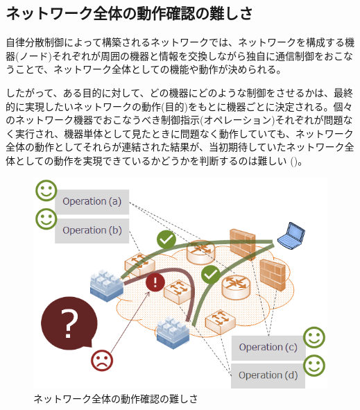   \subsection{ネットワーク全体の動作確認の難しさ}

自律分散制御によって構築されるネットワークでは、ネットワークを構成する機
器(ノード)それぞれが周囲の機器と情報を交換しながら独自に通信制御をおこな
うことで、ネットワーク全体としての機能や動作が決められる。

したがって、ある目的に対して、どの機器にどのような制御をさせるかは、最終
的に実現したいネットワークの動作(目的)をもとに機器ごとに決定される。個々
のネットワーク機器でおこなうべき制御指示(オペレーション)それぞれが問題な
く実行され、機器単体として見たときに問題なく動作していても、ネットワーク
全体の動作としてそれらが連結された結果が、当初期待していたネットワーク全
体としての動作を実現できているかどうかを判断するのは難しい
()。

 \begin{figure}[h]
  \centering
  \includegraphics[scale=0.5]{img/difficulty-of-network-operation.png}
  \caption{ネットワーク全体の動作確認の難しさ}
  \label{fig:difficulty-of-network-operation}
 \end{figure}

